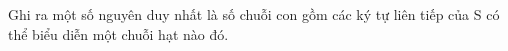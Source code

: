 Ghi ra một số nguyên duy nhất là số chuỗi con gồm các ký tự liên tiếp của S có thể biểu diễn một chuỗi hạt nào đó.  

\